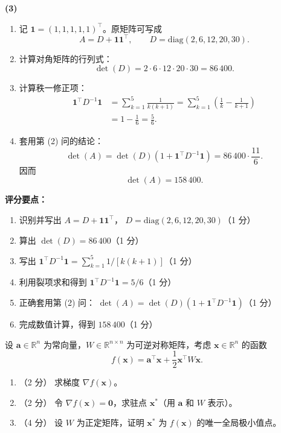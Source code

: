 \documentclass[10pt,a4paper]{exam-zh}
\newcommand{\bvec}[1]{\boldsymbol{#1}}
\newcommand{\diag}{\mathrm{diag}}
\newcommand{\R}{\mathbb{R}}
\newenvironment{grading}
  {\par\smallskip\Needspace{5\baselineskip}\small
   \noindent\textcolor{gradingred}{\textbf{评分要点：}}
   \begin{enumerate}[label=\textcolor{gradingred}{\arabic*.},
     leftmargin=2.4em,itemsep=0pt,topsep=2pt,parsep=0pt]}
  {\end{enumerate}\smallskip}
\newcommand{\gradeitem}[2]{\item #1（\textcolor{gradingred}{#2 分}）}
\newenvironment{answersteps}
  {\begin{enumerate}[label=\textbf{步骤 \arabic*.},
    leftmargin=4.8em,labelsep=0.6em,itemsep=2pt,topsep=3pt,parsep=0pt]}
  {\end{enumerate}}
\newcommand{\subanswer}[1]{%
  \par\medskip\Needspace{6\baselineskip}\noindent\textbf{#1}\par}
\begin{document}
\begin{solution}
\subanswer{(3)}
\begin{answersteps}
  \item 记 $\mathbf1=(1,1,1,1,1)^\top$。原矩阵可写成
  \[
  A=D+\mathbf1\mathbf1^\top,
  \qquad
  D=\diag(2,6,12,20,30).
  \]
  \item 计算对角矩阵的行列式：
  \[
  \det(D)=2\cdot6\cdot12\cdot20\cdot30=86\,400.
  \]
  \item 计算秩一修正项：
  \[
  \begin{aligned}
  \mathbf1^\top D^{-1}\mathbf1
  &=\sum_{k=1}^{5}\frac1{k(k+1)}
    =\sum_{k=1}^{5}\left(\frac1k-\frac1{k+1}\right)\\
  &=1-\frac16=\frac56.
  \end{aligned}
  \]
  \item 套用第 (2) 问的结论：
  \[
  \det(A)
  =\det(D)\left(1+\mathbf1^\top D^{-1}\mathbf1\right)
  =86\,400\cdot\frac{11}{6}.
  \]
  因而
  \[
  \boxed{\det(A)=158\,400}.
  \]
\end{answersteps}
\begin{grading}
  \gradeitem{识别并写出 $A=D+\mathbf1\mathbf1^\top$，
  $D=\diag(2,6,12,20,30)$}{1}
  \gradeitem{算出 $\det(D)=86\,400$}{1}
  \gradeitem{写出 $\mathbf1^\top D^{-1}\mathbf1
  =\sum_{k=1}^5 1/[k(k+1)]$}{1}
  \gradeitem{利用裂项求和得到 $\mathbf1^\top D^{-1}\mathbf1=5/6$}{1}
  \gradeitem{正确套用第 (2) 问：
  $\det(A)=\det(D)(1+\mathbf1^\top D^{-1}\mathbf1)$}{1}
  \gradeitem{完成数值计算，得到 $158\,400$}{1}
\end{grading}
\end{solution}


\begin{problem}[points = 8]
设 $\bvec{a} \in \R^n$ 为常向量，$W \in \R^{n \times n}$ 为可逆对称矩阵，考虑 $\bvec{x} \in \R^n$ 的函数
\[
f(\bvec{x}) = \bvec{a}^\top \bvec{x} + \frac{1}{2}\bvec{x}^\top W \bvec{x}.
\]
\begin{enumerate}
    \item （2 分） 求梯度 $\nabla f(\bvec{x})$。
    \item （2 分） 令 $\nabla f(\bvec{x}) = \bvec{0}$，求驻点 $\bvec{x}^*$（用 $\bvec{a}$ 和 $W$ 表示）。
    \item （4 分） 设 $W$ 为正定矩阵，证明 $\bvec{x}^*$ 为 $f(\bvec{x})$ 的唯一全局极小值点。
\end{enumerate}
\end{problem}
\end{document}
